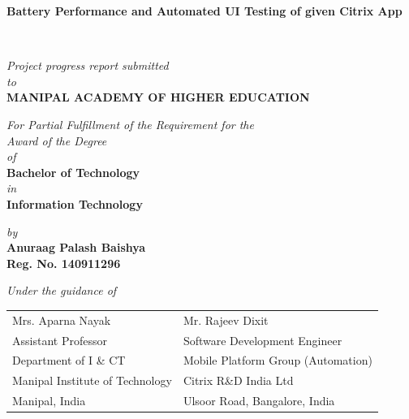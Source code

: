 \documentclass[runningheads,a4paper,12pt]{report}
\begin{document}
\begin{titlepage}
\vspace*{2cm}
	\begin{center}
	\large{\textbf{Battery Performance and Automated UI Testing of given Citrix App}}
	\end{center}
	\vspace{0.5cm}\
	\begin{center}
	\small{\textit{Project progress report submitted} \\ \vspace{0.25cm} \textit{to} \\ \vspace{0.25cm}\textbf{MANIPAL ACADEMY OF HIGHER EDUCATION} \\}
	\end{center}
	\vspace{0.25cm}
	\begin{center}
	\small{\textit{For Partial Fulfillment of the Requirement for the\\ \vspace{0.25cm}Award of the Degree\\ \vspace{0.25cm}of}} \\ \vspace{0.25cm}
	\textbf{Bachelor of Technology} \\  \vspace{0.25cm} \textit{in} \\ \textbf{Information Technology}
	\end{center}
	
	\begin{center}
	\small{\textit{by}} \\
	\textbf{Anuraag Palash Baishya} \\ \textbf{Reg. No. 140911296} \\
	\end{center}


\begin{center}
	\small{\textit{Under the guidance of}} \\
\renewcommand{\baselinestretch}{1}
{	
\begin{table}[h]
	\centering
		\begin{tabular}{p{3in} p{3in}}
			Mrs. Aparna Nayak &  Mr. Rajeev Dixit  \\
			Assistant Professor
 &    Software Development Engineer\\
			Department of I \& CT  &  Mobile Platform Group (Automation) \\
			 Manipal Institute of Technology& Citrix R\&D India Ltd \\
			Manipal, India &  Ulsoor Road, Bangalore, India 
		\end{tabular}
\end{table}
}


\end{center}
\end{titlepage}
\end{document}
